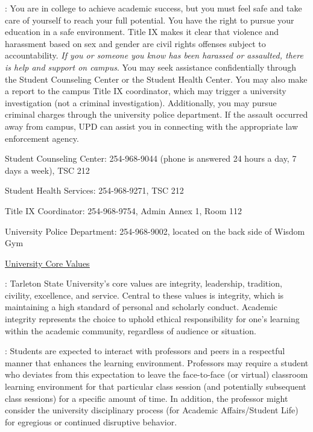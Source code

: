 \documentclass[letterpaper]{article}
\begin{document}
: You are in college to achieve academic success, but you must feel safe and take care of yourself to reach your full potential. You have the right to pursue your education in a safe environment. Title IX makes it clear that violence and harassment based on sex and gender are civil rights offenses subject to accountability. \textit{If you or someone you know has been harassed or assaulted, there is help and support on campus}. You may seek assistance confidentially through the Student Counseling Center or the Student Health Center. You may also make a report to the campus Title IX coordinator, which may trigger a university investigation (not a criminal investigation). Additionally, you may pursue criminal charges through the university police department. If the assault occurred away from campus, UPD can assist you in connecting with the appropriate law enforcement agency.
\begin{center}
Student Counseling Center: 254-968-9044 (phone is answered 24 hours a day, 7 days a week), TSC 212

Student Health Services: 254-968-9271, TSC 212 

Title IX Coordinator: 254-968-9754, Admin Annex 1, Room 112

University Police Department: 254-968-9002, located on the back side of Wisdom Gym
\end{center}

\href{http://www.tarleton.edu/strategicplan/2016-2020/mission-vision.html}{\underline{University Core Values}}

:  Tarleton State University's core values are integrity, leadership, tradition, civility, excellence, and service.  Central to these values is integrity, which is maintaining a high standard of personal and scholarly conduct.  Academic integrity represents the choice to uphold ethical responsibility for one's learning within the academic community, regardless of audience or situation.

:  Students are expected to interact with professors and peers in a respectful manner that enhances the learning environment. Professors may require a student who deviates from this expectation to leave the face-to-face (or virtual) classroom learning environment for that particular class session (and potentially subsequent class sessions) for a specific amount of time. In addition, the professor might consider the university disciplinary process (for Academic Affairs/Student Life) for egregious or continued disruptive behavior.
\end{document}
